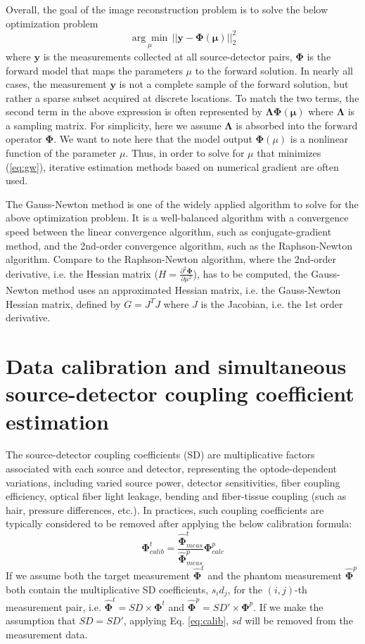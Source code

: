 \documentclass[12pt]{book}               %
\begin{document}
Overall, the goal of the image reconstruction problem is to solve the below optimization problem
\begin{equation}\label{eq:gw}
\underset{\mu}{\arg\min} \, || \mathbf{y-\Phi(\mu)} ||^2_2
\end{equation}
where $\mathbf y$ is the measurements collected at all source-detector pairs, $\mathbf\Phi$ is the forward model that maps the parameters $\mu$ to the forward solution. In nearly all cases, the measurement $\mathbf y$ is not a complete sample of the forward solution, but rather a sparse subset acquired at discrete locations. To match the two terms, the second term in the above expression is often represented by $\mathbf{\Lambda\Phi(\mu)}$ where $\mathbf\Lambda$ is a sampling matrix. For simplicity, here we assume $\mathbf\Lambda$ is absorbed into the forward operator $\mathbf\Phi$. We want to note here that the model output $\mathbf\Phi(\mu)$ is a nonlinear function of the parameter $\mu$. Thus, in order to solve for $\mu$ that minimizes (\ref{eq:gw}), iterative estimation methods based on numerical gradient are often used.

The Gauss-Newton method is one of the widely applied algorithm to solve for the above optimization problem. It is a well-balanced algorithm with a convergence speed between the linear convergence algorithm, such as conjugate-gradient method, and the 2nd-order convergence algorithm, such as the Raphson-Newton algorithm. Compare to the Raphson-Newton algorithm, where the 2nd-order derivative, i.e. the Hessian matrix ($H=\frac{\partial^2 \mathbf\Phi}{\partial\mu^2}$), has to be computed, the Gauss-Newton method uses an approximated Hessian matrix, i.e. the Gauss-Newton Hessian matrix, defined by $G=J^TJ$ where $J$ is the Jacobian, i.e. the 1st order derivative.


\section{Data calibration and simultaneous source-detector coupling coefficient estimation}
The source-detector coupling coefficients (SD) are multiplicative factors associated with each source and detector, representing the optode-dependent variations, including varied source power, detector sensitivities, fiber coupling efficiency, optical fiber light leakage, bending and fiber-tissue coupling (such as hair, pressure differences, etc.). In practices, such coupling coefficients are typically considered to be removed after applying the below calibration formula:
\begin{equation}\label{eq:calib}
\mathbf{\Phi}^{t}_{calib}=\frac{\hat{\mathbf{\Phi}}^{t}_{meas}}{\hat{\mathbf{\Phi}}^{p}_{meas}}\mathbf{\Phi}_{calc}^{p}
\end{equation}
If we assume both the target measurement $\hat{\mathbf{\Phi}}^{t}$ and the phantom measurement $\hat{\mathbf{\Phi}}^{p}$ both contain the multiplicative SD coefficients, $s_id_j$, for the $(i,j)$-th measurement pair, i.e. $\hat{\mathbf{\Phi}}^{t}=SD\times\mathbf{\Phi}^{t}$ and $\hat{\mathbf{\Phi}}^{p}=SD'\times\mathbf{\Phi}^{p}$. If we make the assumption that $SD=SD'$, applying Eq. \ref{eq:calib}, $sd$ will be removed from the measurement data.
\end{document}
